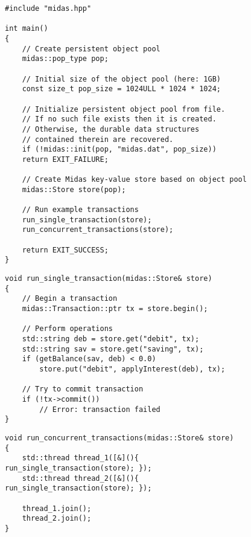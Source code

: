 \begin{figure}
\begin{lstlisting}
#include "midas.hpp"

int main()
{
    // Create persistent object pool
    midas::pop_type pop;

    // Initial size of the object pool (here: 1GB)
    const size_t pop_size = 1024ULL * 1024 * 1024;

    // Initialize persistent object pool from file.
    // If no such file exists then it is created.
    // Otherwise, the durable data structures
    // contained therein are recovered.
    if (!midas::init(pop, "midas.dat", pop_size))
    return EXIT_FAILURE;

    // Create Midas key-value store based on object pool
    midas::Store store(pop);

    // Run example transactions
    run_single_transaction(store);
    run_concurrent_transactions(store);

    return EXIT_SUCCESS;
}
\end{lstlisting}
\caption{}
\label{lst:usage-example-lifetime}
\end{figure}

\begin{figure}
\begin{lstlisting}
void run_single_transaction(midas::Store& store)
{
    // Begin a transaction
    midas::Transaction::ptr tx = store.begin();

    // Perform operations
    std::string deb = store.get("debit", tx);
    std::string sav = store.get("saving", tx);
    if (getBalance(sav, deb) < 0.0)
        store.put("debit", applyInterest(deb), tx);

    // Try to commit transaction
    if (!tx->commit())
        // Error: transaction failed
}
\end{lstlisting}
\caption{}
\label{lst:usage-single-transaction}
\end{figure}

\begin{figure}
\begin{lstlisting}
void run_concurrent_transactions(midas::Store& store)
{
    std::thread thread_1([&](){ run_single_transaction(store); });
    std::thread thread_2([&](){ run_single_transaction(store); });

    thread_1.join();
    thread_2.join();
}
\end{lstlisting}
\caption{}
\label{lst:usage-concurrent-transactions}
\end{figure}
